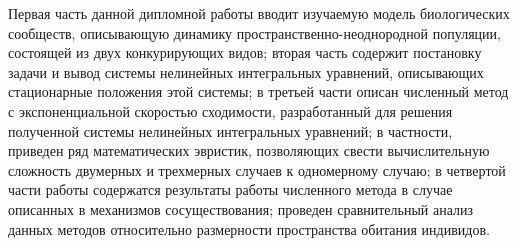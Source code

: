 Первая часть данной дипломной работы вводит изучаемую модель биологических сообществ, описывающую динамику пространственно-неоднородной популяции, состоящей из двух конкурирующих видов; вторая часть содержит постановку задачи и вывод системы нелинейных интегральных уравнений, описывающих стационарные положения этой системы; в третьей части описан численный метод с экспоненциальной скоростью сходимости, разработанный для решения полученной системы нелинейных интегральных уравнений; в частности, приведен ряд математических эвристик, позволяющих свести вычислительную сложность двумерных и трехмерных случаев к одномерному случаю; в четвертой части работы содержатся результаты работы численного метода в случае описанных в \cite{MURRELL} механизмов сосуществования; проведен сравнительный анализ данных методов относительно размерности пространства обитания индивидов. 
